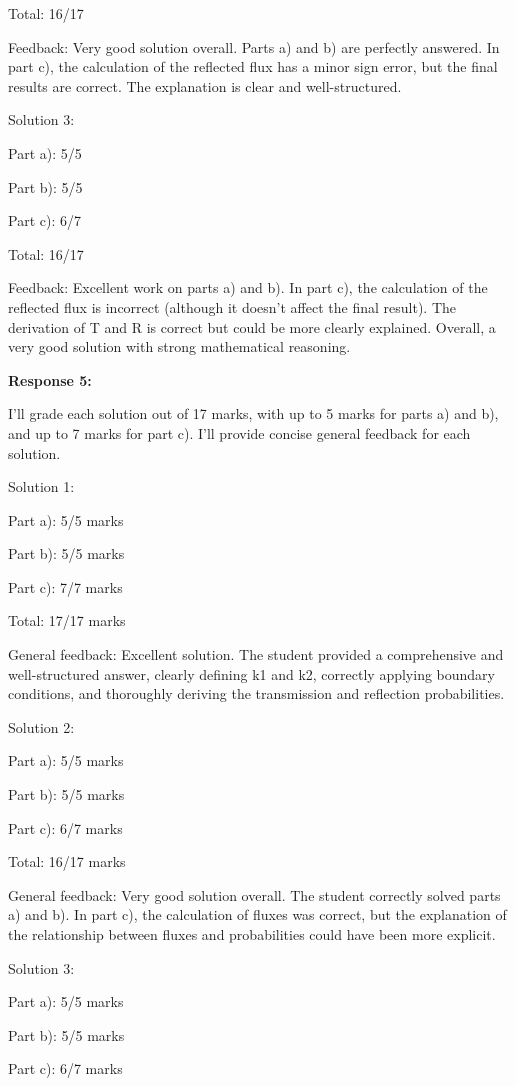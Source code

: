 \documentclass[a4paper,11pt]{article}
\begin{document}
Total: 16/17

Feedback: Very good solution overall. Parts a) and b) are perfectly answered. In part c), the calculation of the reflected flux has a minor sign error, but the final results are correct. The explanation is clear and well-structured.

Solution 3:

Part a): 5/5

Part b): 5/5

Part c): 6/7

Total: 16/17

Feedback: Excellent work on parts a) and b). In part c), the calculation of the reflected flux is incorrect (although it doesn't affect the final result). The derivation of T and R is correct but could be more clearly explained. Overall, a very good solution with strong mathematical reasoning.

\bigskip   
\textbf{Response 5:}

I'll grade each solution out of 17 marks, with up to 5 marks for parts a) and b), and up to 7 marks for part c). I'll provide concise general feedback for each solution.

Solution 1:

Part a): 5/5 marks

Part b): 5/5 marks

Part c): 7/7 marks

Total: 17/17 marks

General feedback: Excellent solution. The student provided a comprehensive and well-structured answer, clearly defining k1 and k2, correctly applying boundary conditions, and thoroughly deriving the transmission and reflection probabilities.

Solution 2:

Part a): 5/5 marks

Part b): 5/5 marks

Part c): 6/7 marks

Total: 16/17 marks

General feedback: Very good solution overall. The student correctly solved parts a) and b). In part c), the calculation of fluxes was correct, but the explanation of the relationship between fluxes and probabilities could have been more explicit.

Solution 3:

Part a): 5/5 marks

Part b): 5/5 marks

Part c): 6/7 marks
\end{document}
